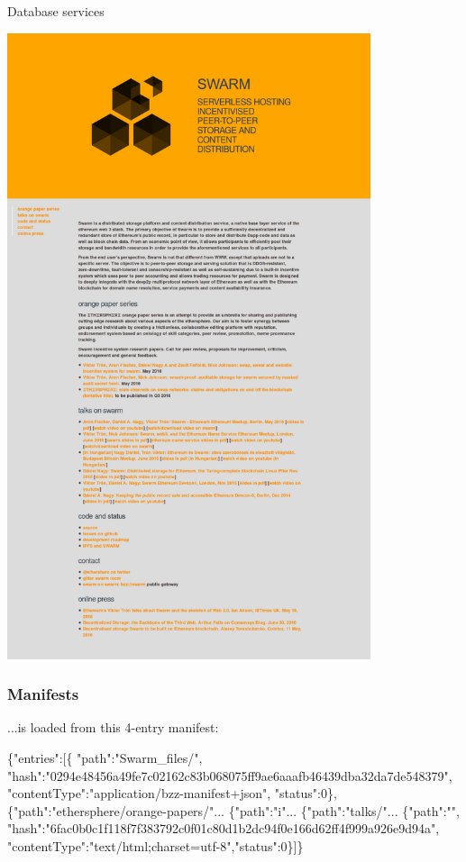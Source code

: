 \documentclass{beamer}
\begin{document}
\begin{section}{Database services}
\begin{frame}
 \includegraphics[width=0.8\textwidth]{devcon-swarmsite.pdf}
\end{frame}

\begin{frame}[fragile]
\frametitle{Manifests}
 ...is loaded from this 4-entry manifest:\\
\tiny
\begin{semiverbatim}
\{"entries":[\{
"path":"Swarm_files/",
"hash":"0294e48456a49fe7c02162c83b068075ff9ae6aaafb46439dba32da7de548379",
"contentType":"application/bzz-manifest+json",
"status":0\},
\{"path":"ethersphere/orange-papers/"...
\{"path":"i"...
\{"path":"talks/"...
\{"path":"",
"hash":"6fac0b0c1f118f7f383792c0f01c80d1b2dc94f0e166d62ff4f999a926e9d94a",
"contentType":"text/html;charset=utf-8","status":0\}]\}\end{semiverbatim}
\end{frame}


\end{section}
\end{document}
